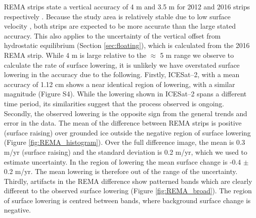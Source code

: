 REMA strips state a vertical accuracy of 4 m and 3.5 m for 2012 and 2016 strips respectively \citep{noh2015automated,howat2019reference}. Because the study area is relatively stable due to low surface velocity \citep{rignot2017measures}, both strips are expected to be more accurate than the large stated accuracy. This also applies to the uncertainty of the vertical offset from hydrostatic equilibrium (Section \ref{sec:floating}), which is calculated from the 2016 REMA strip.  While 4 m is large relative to the $\approx$ 5 m range we observe to calculate the rate of surface lowering, it is unlikely we have overstated surface lowering in the accuracy due to the following. Firstly, ICESat–2, with a mean accuracy of 1.12 cm shows a near identical region of lowering, with a similar magnitude (Figure S4). While the lowering shown in ICESat--2 spans a different time period, its similarities suggest that the process observed is ongoing. Secondly, the observed lowering is the opposite sign from the general trends and error in the data. The mean of the difference between REMA strips is positive (surface raising) over grounded ice outside the negative region of surface lowering (Figure \ref{fig:REMA_histogram}). Over the full difference image, the mean is 0.3 m/yr (surface raising) and the standard deviation is 0.2 m/yr, which we used to estimate uncertainty. In the region of lowering the mean surface change is -0.4 $\pm$ 0.2 m/yr. The mean lowering is therefore out of the range of the uncertainty. Thirdly, artifacts in the REMA difference show patterned bands which are clearly different to the observed surface lowering (Figure \ref{fig:REMA_broad}). The region of surface lowering is centred between bands, where background surface change is negative.

